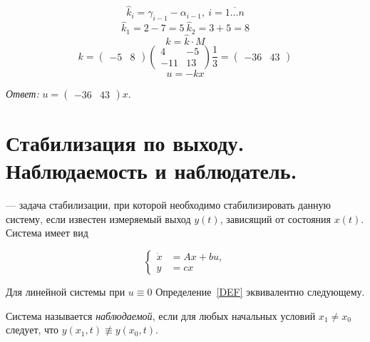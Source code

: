 \documentclass[../../TAU.tex]{subfiles}
\begin{document}
    $$
        \widehat k_i=\gamma    _{i-1}-\alpha_{i-1},\ i=\overline{1\dots n}
    $$
    $$
        \widehat k_1 = 2-7=5\ \widehat k_2 =3+5=8
    $$
    $$
        k=\widehat k\cdot M
    $$
    $$
        k=
        \begin{pmatrix}
        -5 & 8
        \end{pmatrix}
        \begin{pmatrix}
            4 & -5\\
            -11 & 13
        \end{pmatrix}
        \frac{1}{3}
        =
        \begin{pmatrix}
            -36 & 43
        \end{pmatrix}
    $$
    $$
        u = -kx
    $$

    \textit{Ответ: }
    $
        u=
        \begin{pmatrix}
            -36 & 43
        \end{pmatrix}
        x.
    $

\section{Стабилизация по выходу. Наблюдаемость и наблюдатель.}

     --- задача стабилизации, при которой необходимо стабилизировать данную систему, если известен измеряемый выход $y(t)$, зависящий от состояния $x(t)$. Система имеет вид \label{DS}

    \begin{equation}\label{DS}
        \left\{
        \begin{aligned}
            \dot x &= Ax + bu,\\
            y &= c x
        \end{aligned}
        \right.
    \end{equation}


    Для линейной системы  при $u\equiv0$ Определение~\ref{DEF} эквивалентно следующему.
    
    \begin{defi}
        Система  называется \textit{наблюдаемой}, если для любых начальных условий $x_1\neq x_0$ следует, что $y(x_1, t)\not\equiv y(x_0, t)$.
    \end{defi}
\end{document}
